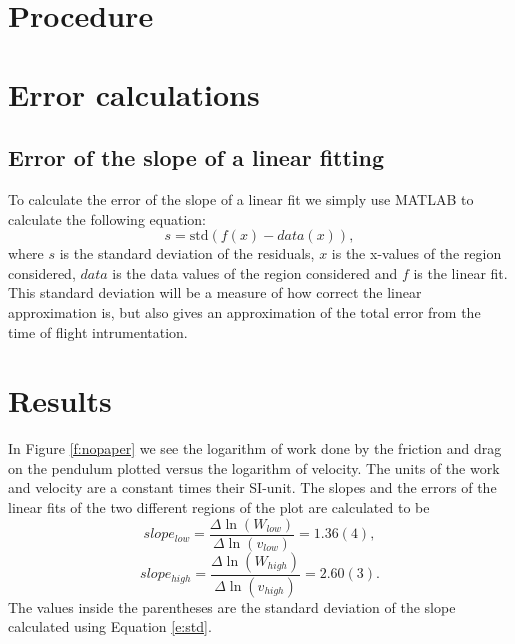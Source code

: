 \documentclass[11pt, a4paper]{article}
\begin{document}
\section{Procedure}

\section{Error calculations}

\subsection{Error of the slope of a linear fitting}
To calculate the error of the slope of a linear fit we simply use MATLAB to calculate the following equation:
\begin{equation}
	s = \text{std}(f(x)-data(x)),
	\label{e:std}
\end{equation}
where $s$ is the standard deviation of the residuals, $x$ is the x-values of the region considered, 
$data$ is the data values of the region considered and $f$ is the linear fit.
This standard deviation will be a measure of how correct the linear approximation is, 
but also gives an approximation of the total error from the time of flight intrumentation.

\section{Results}
In Figure \ref{f:nopaper} we see the logarithm of work done by the friction and 
drag on the pendulum plotted versus the logarithm of velocity. 
The units of the work and velocity are a constant times their SI-unit. 
The slopes and the errors of the linear fits of the two different regions of the plot are calculated to be
\[
	slope_{low}=\frac{\Delta\ln(W_{low})}{\Delta\ln(v_{low})} = 1.36(4),
\]\[
	slope_{high}=\frac{\Delta\ln(W_{high})}{\Delta\ln(v_{high})} = 2.60(3).
\]
The values inside the parentheses are the standard deviation of the slope calculated using Equation \ref{e:std}.
\end{document}
